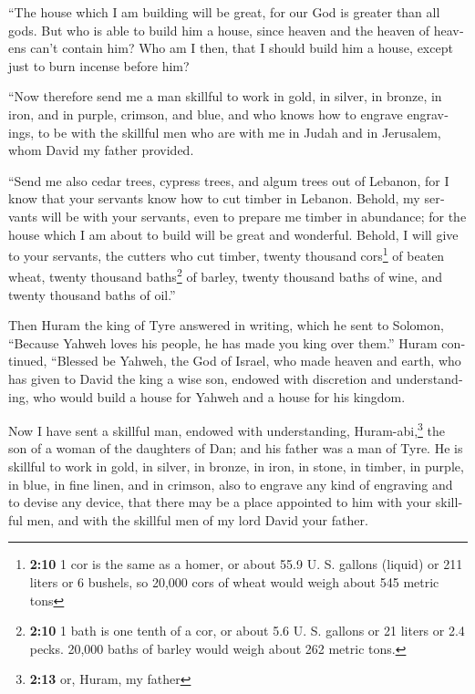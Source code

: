 \begin{paracol}{2}
\begin{otherlanguage}{english}
 ``The house which I am building will be great, for our
God is greater than all gods.  But who is able to build
him a house, since heaven and the heaven of heavens can't contain him?
Who am I then, that I should build him a house, except just to burn
incense before him?

 ``Now therefore send me a man skillful to work in gold,
in silver, in bronze, in iron, and in purple, crimson, and blue, and who
knows how to engrave engravings, to be with the skillful men who are
with me in Judah and in Jerusalem, whom David my father provided.

 ``Send me also cedar trees, cypress trees, and algum
trees out of Lebanon, for I know that your servants know how to cut
timber in Lebanon. Behold, my servants will be with your servants,
 even to prepare me timber in abundance; for the house
which I am about to build will be great and wonderful. 
Behold, I will give to your servants, the cutters who cut timber, twenty
thousand cors\footnote{\textbf{2:10} 1 cor is the same as a homer, or
  about 55.9 U. S. gallons (liquid) or 211 liters or 6 bushels, so
  20,000 cors of wheat would weigh about 545 metric tons} of beaten
wheat, twenty thousand baths\footnote{\textbf{2:10} 1 bath is one tenth
  of a cor, or about 5.6 U. S. gallons or 21 liters or 2.4 pecks. 20,000
  baths of barley would weigh about 262 metric tons.} of barley, twenty
thousand baths of wine, and twenty thousand baths of oil.''

 Then Huram the king of Tyre answered in writing, which
he sent to Solomon, ``Because Yahweh loves his people, he has made you
king over them.''  Huram continued, ``Blessed be Yahweh,
the God of Israel, who made heaven and earth, who has given to David the
king a wise son, endowed with discretion and understanding, who would
build a house for Yahweh and a house for his kingdom.

 Now I have sent a skillful man, endowed with
understanding, Huram-abi,\footnote{\textbf{2:13} or, Huram, my father}
 the son of a woman of the daughters of Dan; and his
father was a man of Tyre. He is skillful to work in gold, in silver, in
bronze, in iron, in stone, in timber, in purple, in blue, in fine linen,
and in crimson, also to engrave any kind of engraving and to devise any
device, that there may be a place appointed to him with your skillful
men, and with the skillful men of my lord David your father.


\end{otherlanguage}
\end{paracol}
